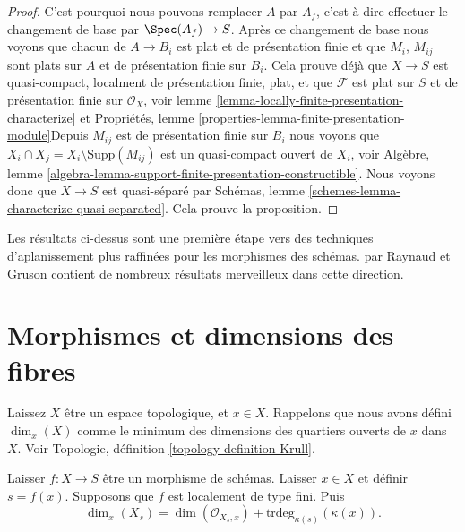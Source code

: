 \begin{proof}
\medskip\noindent

C'est pourquoi nous pouvons remplacer $A$ par $A_f$, c'est-à-dire effectuer le changement de base par $\Spec(A_f) \to S$. Après ce changement de base nous voyons que chacun de $A \to B_i$ est plat et de présentation finie et que $M_i$, $M_{ij}$ sont plats sur $A$
et de présentation finie sur $B_i$. Cela prouve déjà que $X \to S$ est quasi-compact, localment de présentation finie, plat, et que $\mathcal{F}$
est plat sur $S$ et de présentation finie sur $\mathcal{O}_X$, voir lemme \ref{lemma-locally-finite-presentation-characterize}
et Propriétés, lemme \ref{properties-lemma-finite-presentation-module}Depuis $M_{ij}$ est de présentation finie sur $B_i$ nous voyons que
$X_i \cap X_j = X_i \setminus \text{Supp}(M_{ij})$ est un quasi-compact ouvert de $X_i$, voir Algèbre, lemme \ref{algebra-lemma-support-finite-presentation-constructible}. Nous voyons donc que $X \to S$ est quasi-séparé par Schémas, lemme \ref{schemes-lemma-characterize-quasi-separated}. Cela prouve la proposition.

\end{proof}









\begin{remark}

\label{remark-flattening}

Les résultats ci-dessus sont une première étape vers des techniques d'aplanissement plus raffinées pour les morphismes des schémas. \cite{GruRay} par Raynaud et Gruson contient de nombreux résultats merveilleux dans cette direction.

\end{remark}







\section{Morphismes et dimensions des fibres}
\label{section-dimension-fibres}

\noindent
Laissez $X$ être un espace topologique, et $x \in X$. Rappelons que nous avons défini $\dim_x(X)$ comme le minimum des dimensions des quartiers ouverts de $x$ dans $X$. Voir Topologie, définition \ref{topology-definition-Krull}.

\begin{lemma}

\label{lemma-dimension-fibre-at-a-point}
Laisser $f : X \to S$ être un morphisme de schémas. Laisser $x \in X$ et définir $s = f(x)$. Supposons que $f$ est localement de type fini. Puis $$
\dim_x(X_s) =
\dim(\mathcal{O}_{X_s, x}) + \text{trdeg}_{\kappa(s)}(\kappa(x)).
$$
\end{lemma}

